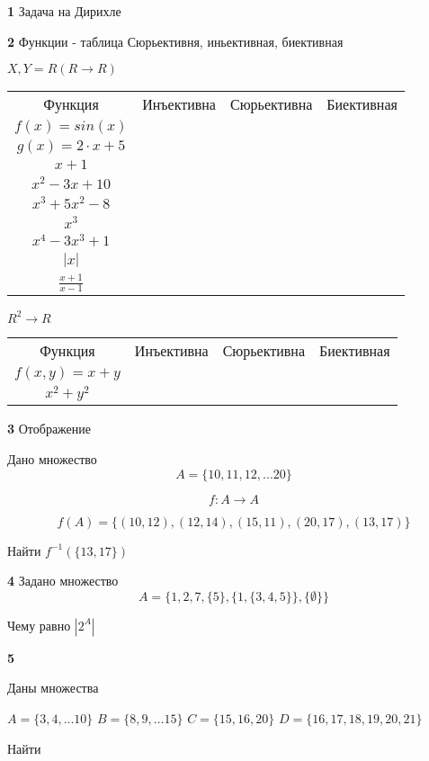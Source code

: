 \documentclass{article}
\begin{document}
\textbf{1}
Задача на Дирихле

\textbf{2} 
Функции - таблица 
Сюрьективня, иньективная, биективная

$X, Y = R (R \rightarrow R)$

\begin{center}
\begin{tabular}{ c c c c }
  Функция & Инъективна & Сюрьективна & Биективная \\
  $f(x) = sin(x)$ &  &  & \\
  $g(x) = 2\cdot x + 5$ &  &  & \\
  $x +1$ &  &  & \\
  $x^2 - 3x +  10$ &  &  & \\
  $x^3 + 5x^2 - 8$ &  &  & \\
  $x^3$ &  &  & \\
  $x^4 - 3x^3 + 1$ &  &  & \\
  $|x|$ &  &  & \\
  $\frac{x + 1}{x - 1}$ &  &  & \\
\end{tabular}
\end{center}

$R^2 \rightarrow R$
\begin{center}
\begin{tabular}{ c c c c }
  Функция & Инъективна & Сюрьективна & Биективная \\
  $f(x, y) = x + y$ &  &  & \\
  $x^2 + y^2$ &  &  & \\
\end{tabular}
\end{center}

\textbf{3}
Отображение

Дано множество 
$$A = \{10, 11, 12, ... 20\}$$

$$f : A \rightarrow A$$

$$f(A) = \{(10, 12), (12, 14), (15, 11), (20, 17), (13, 17) \}$$

Найти $f^{-1}(\{13, 17\})$

\textbf{4} 
Задано множество $$A = \{ 1, 2, 7, \{5\}, \{1, \{ 3,4 ,5 \}\}, \{\emptyset \}\}$$

Чему равно $|2^A|$

\textbf{5}

Даны множества

$A = \{ 3, 4, ... 10 \}$
$B = \{ 8, 9, ... 15 \}$
$C = \{ 15, 16, 20 \}$
$D = \{ 16, 17, 18, 19, 20, 21\}$

Найти 
\end{document}
